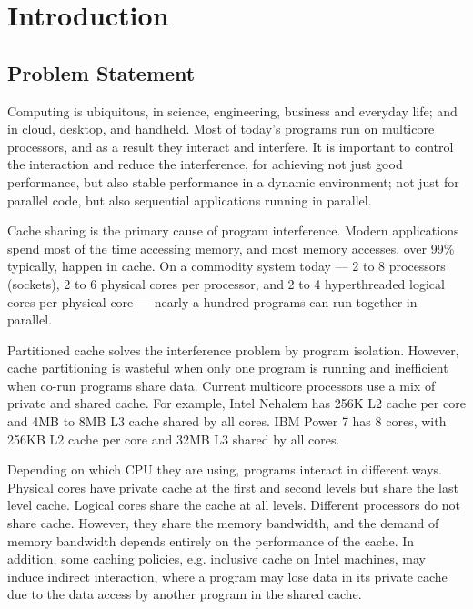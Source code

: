 \chapter{Introduction}
\label{chap:intro}

\section{Problem Statement}

Computing is ubiquitous, in science, engineering, business and
everyday life; and in cloud, desktop, and handheld.  Most of today's
programs run on multicore processors, and as a result they interact and
interfere.  It is important to control the
interaction and reduce the interference, for achieving not just
good performance, but also stable performance in a
dynamic environment; not just for parallel code, but also sequential
applications running in parallel.

Cache sharing is the primary cause of program interference.  Modern
applications spend most of the time accessing memory, and
most memory accesses, over 99\% typically, happen in cache.  On a
commodity system today --- 2 to 8
processors  (sockets), 2 to 6 physical cores per processor, and 2 to 4 hyperthreaded logical cores per physical core --- nearly a hundred programs
can run together in parallel.  

Partitioned cache solves the interference problem by program
isolation. However, cache partitioning is wasteful when only one program is
running and inefficient when co-run programs share data.  Current
multicore processors use a mix of private and shared cache. For
example, Intel Nehalem has 256K L2 cache per core and 4MB to 8MB L3
cache shared by all cores. IBM Power 7 has 8 cores, with 256KB L2
cache per core and 32MB L3 shared by all cores.

Depending on which CPU they are using, programs
interact in different ways.  Physical cores have private
cache at the first and second levels but share the last level cache.
Logical cores share the cache at all levels.  Different processors do
not share cache.  However, they share the memory bandwidth, and the
demand of memory bandwidth depends entirely on the performance of the
cache.  In addition, some caching policies, e.g. inclusive cache on
Intel machines, may induce indirect interaction, where a program may lose data in
its private cache due to the data access by another program in the shared
cache.


